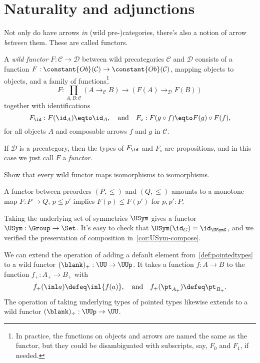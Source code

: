 \section{Naturality and adjunctions}
\label{sec:naturality}

Not only do have arrows \emph{in} (wild pre-)categories, there's also
a notion of arrow \emph{between} them. These are called functors.
\begin{definition}\label{def:functor}
  A \emph{wild functor}
  $F : \mathcal C \to \mathcal D$
  between wild precategories $\mathcal C$ and $\mathcal D$
  consists of a function
  $F : \constant{Ob}(\mathcal C) \to \constant{Ob}(\mathcal C)$,
  mapping objects to objects,
  and a family of functions\footnote{%
    In practice, the functions on objects and arrows are named the same as
    the functor, but they could be disambiguated with subscripts,
    say, $F_0$ and $F_1$, if needed.}
  \[
    F : \prod_{A,B:\mathcal C}(A \to_{\mathcal C} B) \to (F(A) \to_{\mathcal D} F(B))
  \]
  together with identifications
  \[
    F_{\id} : F(\id_A) \eqto \id_A,\quad\text{and}\quad
    F_{\circ} : F(g\circ f) \eqto F(g)\circ F(f),
  \]
  for all objects $A$ and composable arrows $f$ and $g$ in $\mathcal C$.

  If $\mathcal D$ is a precategory, then the types of $F_{\id}$ and $F_{\circ}$
  are propositions, and in this case we just call $F$ a \emph{functor}.
\end{definition}
\begin{xca}
  Show that every wild functor maps isomorphisms to isomorphisms.
\end{xca}
\begin{example}
  A functor between preorders $(P,\le)$ and $(Q,\le)$ amounts to a monotone map
  $F : P\to Q$, \ie $p\le p'$ implies $F(p) \le F(p')$ for $p,p':P$.
\end{example}
\begin{example}
  Taking the underlying set of symmetries $\USym$
  gives a functor $\USym : \Group \to \Set$.
  It's easy to check that $\USym(\id_G) = \id_{\USymG}$,
  and we verified the preservation of composition
  in~\cref{cor:USym-compose}.
\end{example}
\begin{example}\label{ex:add-remove-basepoint}
  We can extend the operation of adding a default element
  from~\cref{def:pointedtypes}
  to a wild functor $(\blank)_+ : \UU \to \UUp$.
  It takes a function $f : A \to B$
  to the function $f_+ : A_+ \to B_+$
  with
  \[
    f_+(\inl a) \defeq \inl{f(a)},\quad\text{and}\quad
    f_+(\pt_{A_+}) \defeq \pt_{B_+}.
  \]
  The operation of taking underlying types of pointed types
  likewise extends to a wild functor $(\blank)_\div : \UUp \to \UU$.
\end{example}
